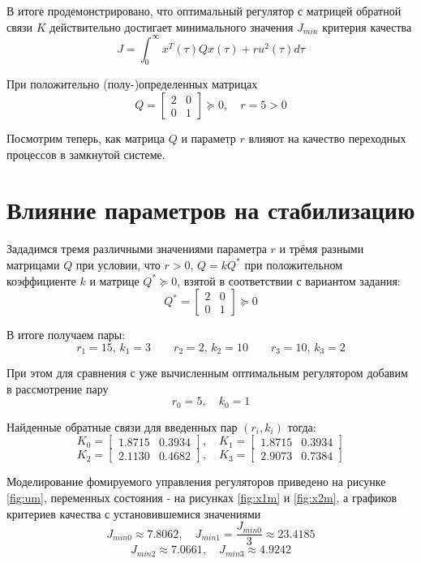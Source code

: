 \documentclass[a4paper,hidelinks,14pt]{extarticle}
\begin{document}
	В итоге продемонстрировано, что оптимальный регулятор с матрицей обратной связи $K$ действительно достигает минимального значения $J_{min}$ критерия качества
	\[
		J = \int_0^\infty x^T(\tau) Q x(\tau) + r u^2(\tau) d\tau
	\]

	При положительно (полу-)определенных матрицах
	\[
		Q = \begin{bmatrix}
			2 & 0 \\
			0 & 1
		\end{bmatrix} \succcurlyeq 0, \quad
		r = 5 > 0
	\]

	Посмотрим теперь, как матрица $Q$ и параметр $r$ влияют на качество переходных процессов в замкнутой системе.

	\section{Влияние параметров на стабилизацию}
	Зададимся тремя различными значениями параметра $r$ и трёмя разными матрицами $Q$ при условии, что $r > 0$, $Q = k Q^*$ при положительном коэффициенте $k$ и матрице $Q^*\succcurlyeq 0$, взятой в соответствии с вариантом задания:
	\[
		Q^* = \begin{bmatrix}
			2 & 0 \\
			0 & 1
		\end{bmatrix} \succcurlyeq 0
	\]

	В итоге получаем пары:
	\[
		r_1 = 15,\, k_1 = 3 \qquad
		r_2 = 2,\, k_2 = 10 \qquad
		r_3 = 10,\, k_3 = 2
	\]

	При этом для сравнения с уже вычисленным оптимальным регулятором добавим в рассмотрение пару
	\[
		r_0 = 5,\quad k_0 = 1
	\]

	Найденные обратные связи для введенных пар $(r_i, k_i)$ тогда:
	\[
		K_0 = \begin{bmatrix}
			1.8715 & 0.3934 
		\end{bmatrix}, \quad
		K_1 = \begin{bmatrix}
			1.8715 & 0.3934
		\end{bmatrix}
	\]
	\[
		K_2 = \begin{bmatrix}
			2.1130 & 0.4682
		\end{bmatrix}, \quad
		K_3 = \begin{bmatrix}
			2.9073 & 0.7384
		\end{bmatrix}
	\]

	Моделирование фомируемого управления регуляторов приведено на рисунке \ref{fig:um}, переменных состояния - на рисунках \ref{fig:x1m} и \ref{fig:x2m}, а графиков критериев качества с установившемися значениями
	\[
		J_{min0} \approx 7.8062, \quad J_{min1} = \dfrac{J_{min0}}{3} \approx 23.4185
	\]
	\[
		J_{min2} \approx 7.0661, \quad J_{min3} \approx 4.9242
	\]
\end{document}
